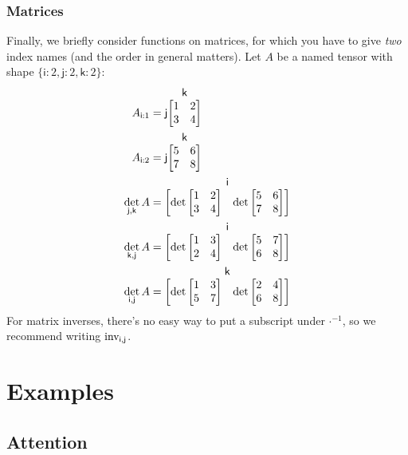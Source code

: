 \documentclass{article}
\makeatletter
\newcommand{\name}[1]{\mathsf{#1}}
\newcommand{\nmatrix}[3]{\name{#1}\begin{array}[b]{@{}c@{}}\name{#2}\\\begin{bmatrix}#3\end{bmatrix}\end{array}}
\makeatother
\begin{document}
\subsubsection{Matrices}

Finally, we briefly consider functions on matrices, for which you have to give \emph{two} index names (and the order in general matters). Let $A$ be a named tensor with shape $\{\name{i}:2,\name{j}:2,\name{k}:2\}$:
\begin{align*}
A_{\name{i}:1} &= \nmatrix{j}{k}{
  1 & 2 \\
  3 & 4
} \\
A_{\name{i}:2} &= \nmatrix{j}{k}{
  5 & 6 \\
  7 & 8
} \\
\det_{\name{j},\name{k}} A &= \nmatrix{}{i}{\det \begin{bmatrix} 1 & 2 \\ 3 & 4 \end{bmatrix} & \det \begin{bmatrix} 5 & 6 \\ 7 & 8 \end{bmatrix}} \\
\det_{\name{k},\name{j}} A &= \nmatrix{}{i}{\det \begin{bmatrix} 1 & 3 \\ 2 & 4 \end{bmatrix} & \det \begin{bmatrix} 5 & 7 \\ 6 & 8 \end{bmatrix}} \\
\det_{\name{i},\name{j}} A &= \nmatrix{}{k}{\det \begin{bmatrix} 1 & 3 \\ 5 & 7 \end{bmatrix} & \det \begin{bmatrix} 2 & 4 \\ 6 & 8 \end{bmatrix}}
\end{align*}
For matrix inverses, there's no easy way to put a subscript under $\mathord\cdot^{-1}$, so we recommend writing $\mathop{\text{inv}}\displaylimits_{\name{i},\name{j}}$.

\section{Examples}
\label{sec:examples}

\subsection{Attention}
\end{document}
